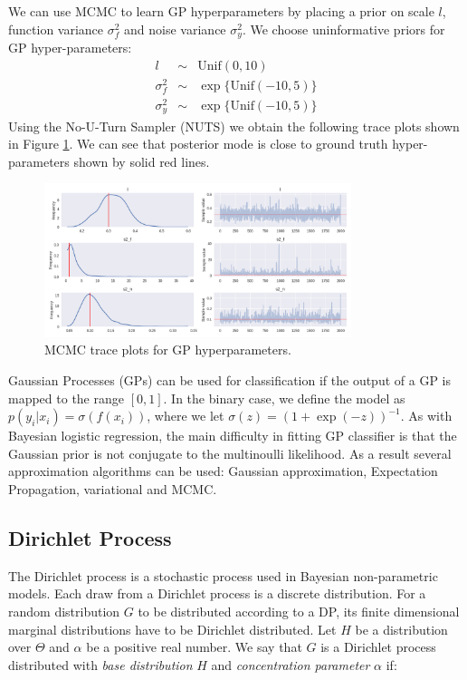 We can use MCMC to learn GP hyperparameters by placing a prior on scale $l$, function variance $\sigma_{f}^{2}$ and noise variance $\sigma_{y}^{2}$. We choose uninformative priors for GP hyper-parameters:
\begin{eqnarray}
    l &\sim& \mathrm{Unif}(0,10)\\
    \sigma_{f}^{2} &\sim& \exp\{\mathrm{Unif}(-10,5)\}\\
    \sigma_{y}^{2} &\sim& \exp\{\mathrm{Unif}(-10,5)\}
\end{eqnarray}
Using the No-U-Turn Sampler (NUTS) we obtain the following trace plots shown in Figure \ref{fig:gp_hyper}. We can see that posterior mode is close to ground truth hyper-parameters shown by solid red lines.\\

\begin{figure}[tbhp]
    \centering
    \includegraphics[width=0.8\textwidth, trim={10 10 10 10}]{figures/gp1_hyperparams.png}
    \caption{MCMC trace plots for GP hyperparameters.}
    \label{fig:gp_hyper}
\end{figure}
 
Gaussian Processes (GPs) can be used for classification if the output of a GP is mapped to the range $[0, 1]$. In the binary case, we define the model as $p(y_i|x_i) = \sigma(f(x_i))$, where we let $\sigma(z)=(1+\exp(-z))^{-1}$. As with Bayesian logistic regression, the main difficulty in fitting GP classifier is that the Gaussian prior is not conjugate to the multinoulli likelihood. As a result several approximation algorithms can be used: Gaussian approximation, Expectation Propagation, variational and MCMC. 


\subsection{Dirichlet Process}


The Dirichlet process is a stochastic process used in Bayesian non-parametric models. Each draw from a Dirichlet process is a discrete distribution. For a random distribution $G$ to be distributed according to a DP, its finite dimensional marginal distributions have to be Dirichlet distributed. Let $H$ be a distribution over $\Theta$ and $\alpha$ be a positive real number. We say that $G$ is a Dirichlet process distributed with \textit{base distribution} $H$ and \textit{concentration parameter} $\alpha$ if:


